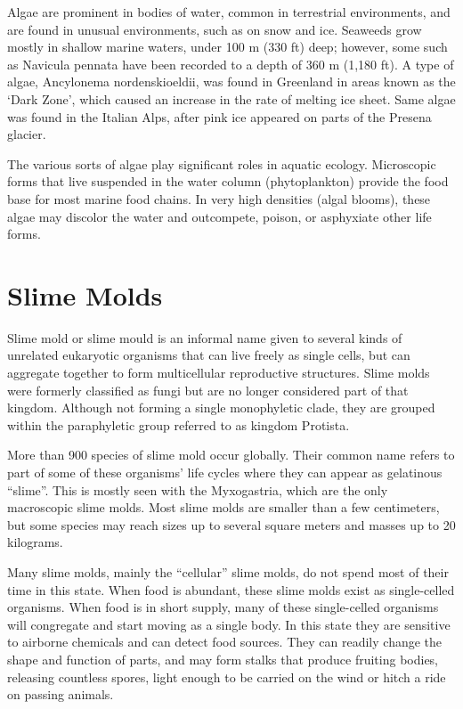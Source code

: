 Algae are prominent in bodies of water, common in terrestrial environments, and are found in unusual environments, such as on snow and ice. Seaweeds grow mostly in shallow marine waters, under 100 m (330 ft) deep; however, some such as Navicula pennata have been recorded to a depth of 360 m (1,180 ft). A type of algae, Ancylonema nordenskioeldii, was found in Greenland in areas known as the `Dark Zone', which caused an increase in the rate of melting ice sheet. Same algae was found in the Italian Alps, after pink ice appeared on parts of the Presena glacier.

The various sorts of algae play significant roles in aquatic ecology. Microscopic forms that live suspended in the water column (phytoplankton) provide the food base for most marine food chains. In very high densities (algal blooms), these algae may discolor the water and outcompete, poison, or asphyxiate other life forms.

\hypertarget{slime-molds}{%
\section{Slime Molds}\label{slime-molds}}

Slime mold or slime mould is an informal name given to several kinds of unrelated eukaryotic organisms that can live freely as single cells, but can aggregate together to form multicellular reproductive structures. Slime molds were formerly classified as fungi but are no longer considered part of that kingdom. Although not forming a single monophyletic clade, they are grouped within the paraphyletic group referred to as kingdom Protista.

More than 900 species of slime mold occur globally. Their common name refers to part of some of these organisms' life cycles where they can appear as gelatinous ``slime''. This is mostly seen with the Myxogastria, which are the only macroscopic slime molds. Most slime molds are smaller than a few centimeters, but some species may reach sizes up to several square meters and masses up to 20 kilograms.

Many slime molds, mainly the ``cellular'' slime molds, do not spend most of their time in this state. When food is abundant, these slime molds exist as single-celled organisms. When food is in short supply, many of these single-celled organisms will congregate and start moving as a single body. In this state they are sensitive to airborne chemicals and can detect food sources. They can readily change the shape and function of parts, and may form stalks that produce fruiting bodies, releasing countless spores, light enough to be carried on the wind or hitch a ride on passing animals.

